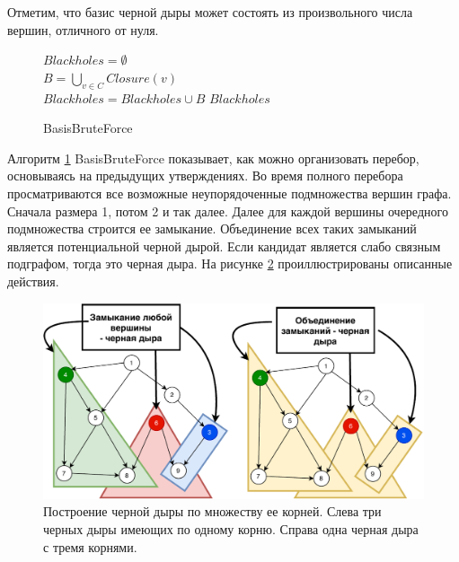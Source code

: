 \documentclass[12pt,a4paper,oneside,openany]{article}
\theoremstyle{definition}
\theoremstyle{lemma}
\theoremstyle{remark}
\begin{document}
Отметим, что базис черной дыры может состоять из произвольного числа вершин, отличного от нуля.

\linespread{1.0}
\begin{figure}[H]
	\begin{center}
		\begin{algorithm}[H]
			\SetAlgoLined

                        $Blackholes = \emptyset$ \\
                         {
                             {
                                $B = \bigcup\limits_{v \in C} Closure(v)$ \\
                                 {
                                    $Blackholes = Blackholes \cup B$
                                }
                            }
                        }
                        \Return $Blackholes$
			\label{alg:basisbruteforce}
			\caption{BasisBruteForce}
		\end{algorithm}
	\end{center}
\end{figure}
\linespread{1.5}

Алгоритм \ref{alg:basisbruteforce} BasisBruteForce показывает, как можно организовать перебор, основываясь на предыдущих утверждениях.
Во время полного перебора просматриваются все возможные неупорядоченные подмножества вершин графа.
Сначала размера 1, потом 2 и так далее.
Далее для каждой вершины очередного подмножества строится ее замыкание.
Объединение всех таких замыканий является потенциальной черной дырой.
Если кандидат является слабо связным подграфом, тогда это черная дыра.
На рисунке \ref{fig:blackholerootscolored} проиллюстрированы описанные действия.

\begin{figure}[H]
      \centering
      \includegraphics[width=0.8\linewidth]{images/blackhole_roots.pdf}
      \caption{Построение черной дыры по множеству ее корней.
Слева три черных дыры имеющих по одному корню. Справа одна черная дыра с тремя корнями.}
      \label{fig:blackholerootscolored}
\end{figure}
\end{document}
